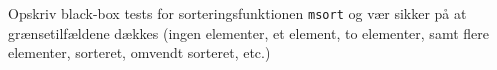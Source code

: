 Opskriv black-box tests for sorteringsfunktionen \lstinline{msort} og vær
  sikker på at grænsetilfældene dækkes (ingen elementer, et element,
  to elementer, samt flere elementer, sorteret, omvendt sorteret, etc.)